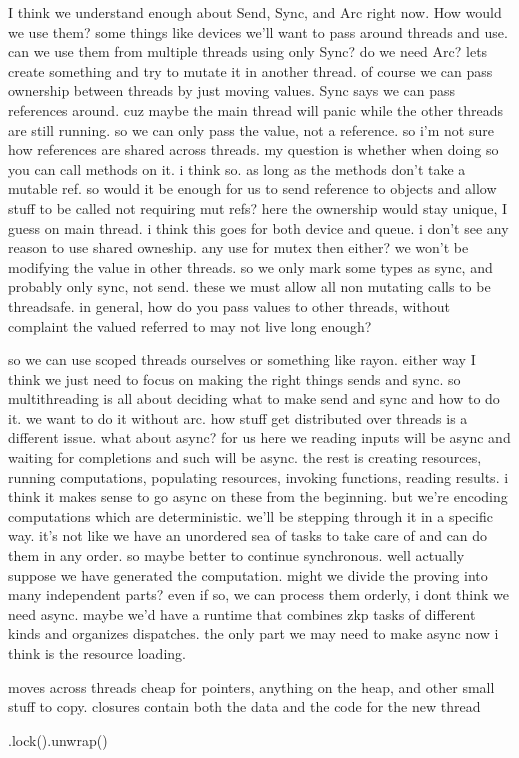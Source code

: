 I think we understand enough about Send, Sync, and Arc right now. How would we use them?
some things like devices we'll want to pass around threads and use. can we use them from multiple threads using only Sync? do we need Arc? 
lets create something and try to mutate it in another thread. of course we can pass ownership between threads by just moving values. 
Sync says we can pass references around. cuz maybe the main thread will panic while the other threads are still running. so we can only pass the value, not a reference. so i'm not sure how references are shared across threads. my question is whether when doing so you can call methods on it. i think so. as long as the methods don't take a mutable ref.
so would it be enough for us to send reference to objects and allow stuff to be called not requiring mut refs? here the ownership would stay unique, I guess on main thread. i think this goes for both device and queue. i don't see any reason to use shared owneship. any use for mutex then either? we won't be modifying the value in other threads. 
so we only mark some types as sync, and probably only sync, not send. these we must allow all non mutating calls to be threadsafe.
in general, how do you pass values to other threads, without complaint the valued referred to may not live long enough?

so we can use scoped threads ourselves or something like rayon. either way I think we just need to focus on making the right things sends and sync. 
so multithreading is all about deciding what to make send and sync and how to do it. we want to do it without arc. how stuff get distributed over threads is a different issue. 
what about async? for us here we reading inputs will be async and waiting for completions and such will be async. the rest is creating resources, running computations, populating resources, invoking functions, reading results. i think it makes sense to go async on these from the beginning. 
but we're encoding computations which are deterministic. we'll be stepping through it in a specific way. it's not like we have an unordered sea of tasks to take care of and can do them in any order. so maybe better to continue synchronous. 
well actually suppose we have generated the computation. might we divide the proving into many independent parts? even if so, we can process them orderly, i dont think we need async.
maybe we'd have a runtime that combines zkp tasks of different kinds and organizes dispatches. 
the only part we may need to make async now i think is the resource loading. 



moves across threads cheap for pointers, anything on the heap, and other small stuff to copy. 
closures contain both the data and the code for the new thread


.lock().unwrap()

